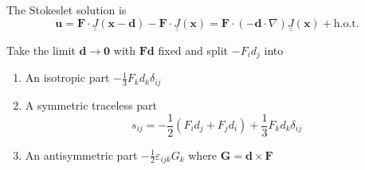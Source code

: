 \documentclass{jknotes}
\newcommand{\dunder}[1]{\underline{\underline{#1}}}
\newcommand{\x}{\bm{x}}
\begin{document}
\begin{center}
\end{center}

The Stokeslet solution is
\begin{equation}
	\bm{u} = \bm{F}\cdot\dunder{J} (\x-\bm{d}) - \bm{F} \cdot \dunder{J}(\x) =
	\bm{F} \cdot (-\bm{d}\cdot\nabla)\dunder{J}(\x) + \text{h.o.t.}
\end{equation}

Take the limit $\bm{d} \to \bm{0}$ with $\bm{F}\bm{d}$ fixed and split $-F_i
d_j$ into
\begin{enumerate}
	\item An isotropic part $-\frac{1}{3} F_k d_k \delta_{ij}$
	\item A symmetric traceless part
		\begin{equation}
			s_{ij} = -\frac{1}{2} (F_i d_j + F_j d_i) + \frac{1}{3} F_k d_k
			\delta_{ij}
		\end{equation}
	\item An antisymmetric part $-\frac{1}{2}\varepsilon_{ijk} G_k$ where
		$\bm{G} = \bm{d} \times \bm{F}$
\end{enumerate}
\end{document}
